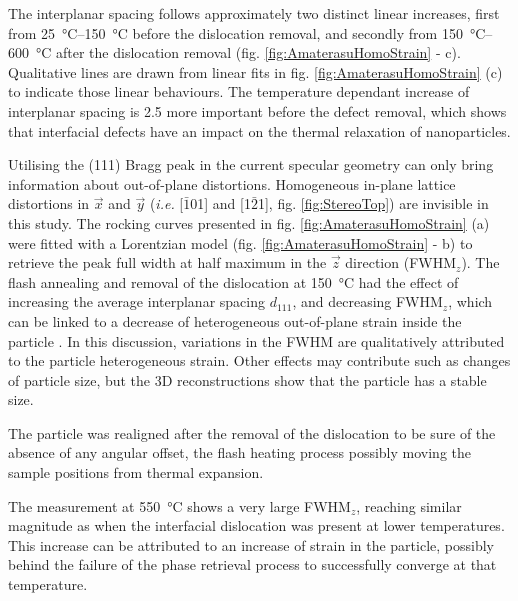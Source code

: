 The interplanar spacing follows approximately two distinct linear increases, first from \qtyrange{25}{150}{\degreeCelsius} before the dislocation removal, and secondly from \qtyrange{150}{600}{\degreeCelsius} after the dislocation removal (fig. \ref{fig:AmaterasuHomoStrain} - c).
Qualitative lines are drawn from linear fits in fig. \ref{fig:AmaterasuHomoStrain} (c) to indicate those linear behaviours.
The temperature dependant increase of interplanar spacing is \num{2.5} more important before the defect removal, which shows that interfacial defects have an impact on the thermal relaxation of nanoparticles.

Utilising the (111) Bragg peak in the current specular geometry can only bring information about out-of-plane distortions.
Homogeneous in-plane lattice distortions in $\vec{x}$ and $\vec{y}$ (\textit{i.e.} [$\bar{1}$01] and [1$\bar{2}$1], fig. \ref{fig:StereoTop}) are invisible in this study.
The rocking curves presented in fig. \ref{fig:AmaterasuHomoStrain} (a) were fitted with a Lorentzian model (fig. \ref{fig:AmaterasuHomoStrain} - b) to retrieve the peak full width at half maximum in the $\vec{z}$ direction (FWHM$_z$).
The flash annealing and removal of the dislocation at \qty{150}{\degreeCelsius} had the effect of increasing the average interplanar spacing $d_{111}$, and decreasing FWHM$_z$, which can be linked to a decrease of heterogeneous out-of-plane strain inside the particle \parencite{Warren1990}.
In this discussion, variations in the FWHM are qualitatively attributed to the particle heterogeneous strain.
Other effects may contribute such as changes of particle size, but the 3D reconstructions show that the particle has a stable size.

The particle was realigned after the removal of the dislocation to be sure of the absence of any angular offset, the flash heating process possibly moving the sample positions from thermal expansion.

The measurement at \qty{550}{\degreeCelsius} shows a very large FWHM$_z$, reaching similar magnitude as when the interfacial dislocation was present at lower temperatures.
This increase can be attributed to an increase of strain in the particle, possibly behind the failure of the phase retrieval process to successfully converge at that temperature.


